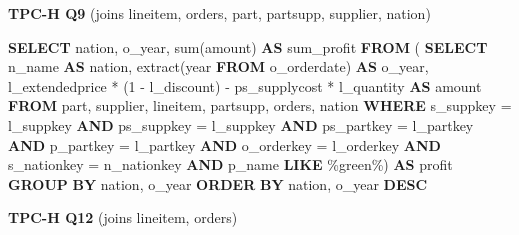 \documentclass[
]{article}
\newenvironment{Shaded}{}{}
\newcommand{\DataTypeTok}[1]{\textcolor[rgb]{0.56,0.13,0.00}{#1}}
\newcommand{\DecValTok}[1]{\textcolor[rgb]{0.25,0.63,0.44}{#1}}
\newcommand{\FunctionTok}[1]{\textcolor[rgb]{0.02,0.16,0.49}{#1}}
\newcommand{\KeywordTok}[1]{\textcolor[rgb]{0.00,0.44,0.13}{\textbf{#1}}}
\newcommand{\NormalTok}[1]{#1}
\newcommand{\OperatorTok}[1]{\textcolor[rgb]{0.40,0.40,0.40}{#1}}
\newcommand{\StringTok}[1]{\textcolor[rgb]{0.25,0.44,0.63}{#1}}
\begin{document}
\textbf{TPC-H Q9} (joins lineitem, orders, part, partsupp, supplier,
nation)

\begin{Shaded}
\begin{Highlighting}[]
\KeywordTok{SELECT}
\NormalTok{    nation,}
\NormalTok{    o\_year,}
    \FunctionTok{sum}\NormalTok{(amount) }\KeywordTok{AS}\NormalTok{ sum\_profit}
\KeywordTok{FROM}\NormalTok{ (}
    \KeywordTok{SELECT}
\NormalTok{        n\_name }\KeywordTok{AS}\NormalTok{ nation,}
        \FunctionTok{extract}\NormalTok{(}\DataTypeTok{year} \KeywordTok{FROM}\NormalTok{ o\_orderdate) }\KeywordTok{AS}\NormalTok{ o\_year,}
\NormalTok{        l\_extendedprice }\OperatorTok{*}\NormalTok{ (}\DecValTok{1} \OperatorTok{{-}}\NormalTok{ l\_discount) }\OperatorTok{{-}}\NormalTok{ ps\_supplycost }\OperatorTok{*}\NormalTok{ l\_quantity }\KeywordTok{AS}\NormalTok{ amount}
    \KeywordTok{FROM}
\NormalTok{        part,}
\NormalTok{        supplier,}
\NormalTok{        lineitem,}
\NormalTok{        partsupp,}
\NormalTok{        orders,}
\NormalTok{        nation}
    \KeywordTok{WHERE}
\NormalTok{        s\_suppkey }\OperatorTok{=}\NormalTok{ l\_suppkey}
        \KeywordTok{AND}\NormalTok{ ps\_suppkey }\OperatorTok{=}\NormalTok{ l\_suppkey}
        \KeywordTok{AND}\NormalTok{ ps\_partkey }\OperatorTok{=}\NormalTok{ l\_partkey}
        \KeywordTok{AND}\NormalTok{ p\_partkey }\OperatorTok{=}\NormalTok{ l\_partkey}
        \KeywordTok{AND}\NormalTok{ o\_orderkey }\OperatorTok{=}\NormalTok{ l\_orderkey}
        \KeywordTok{AND}\NormalTok{ s\_nationkey }\OperatorTok{=}\NormalTok{ n\_nationkey}
        \KeywordTok{AND}\NormalTok{ p\_name }\KeywordTok{LIKE} \StringTok{\textquotesingle{}\%green\%\textquotesingle{}}\NormalTok{) }\KeywordTok{AS}\NormalTok{ profit}
\KeywordTok{GROUP} \KeywordTok{BY}
\NormalTok{    nation,}
\NormalTok{    o\_year}
\KeywordTok{ORDER} \KeywordTok{BY}
\NormalTok{    nation,}
\NormalTok{    o\_year }\KeywordTok{DESC}
\end{Highlighting}
\end{Shaded}

\textbf{TPC-H Q12} (joins lineitem, orders)
\end{document}

